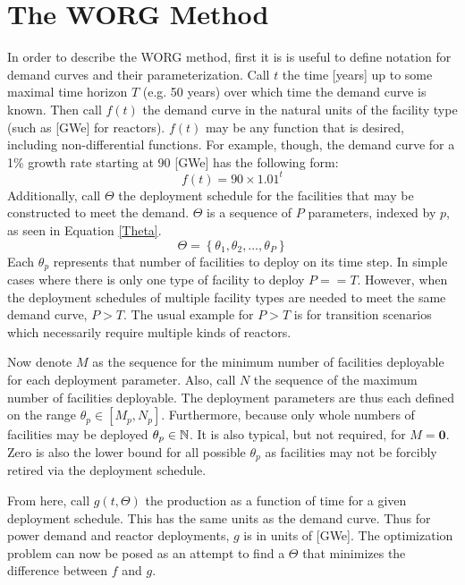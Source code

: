 \section{The WORG Method}
\label{method}

In order to describe the WORG method, first it is is useful to define  
notation for demand curves and their parameterization.  Call $t$ the time
[years] up to some maximal time horizon $T$ (e.g. 50 years) over which time 
the demand curve is known.  Then call $f(t)$ the demand curve in the natural 
units of the facility type (such as [GWe] for reactors).
$f(t)$ may be any function that is desired, including non-differential 
functions. For example, though, the demand curve for a 1\% growth rate 
starting at 90 [GWe] has the following form:
\begin{equation}
\label{f-1}
f(t) = 90\times 1.01^t
\end{equation}
Additionally, call $\Theta$ the deployment schedule for the facilities that 
may be constructed to meet the demand.
$\Theta$ is a sequence of $P$ parameters, indexed by $p$, as seen in 
Equation \ref{Theta}.
\begin{equation}
\label{Theta}
\Theta = \left\{\theta_1, \theta_2, \ldots, \theta_P\right\}
\end{equation}
Each $\theta_p$ represents that number of facilities to deploy on its
time step. In simple cases where there is only one type of facility
to deploy $P == T$.  However, when the deployment schedules of multiple 
facility types are needed to meet the same demand curve, $P > T$.  The usual
example for $P > T$ is for transition scenarios which necessarily require 
multiple kinds of reactors.

Now denote $M$ as the sequence for the minimum number of facilities deployable
for each deployment parameter. Also, call $N$ the sequence of the maximum number
of facilities deployable. The deployment parameters are thus each defined
on the range $\theta_p \in [M_p, N_p]$. Furthermore, because only whole
numbers of facilities may be deployed $\theta_p \in \mathbb{N}$.  It is also typical, 
but not required, for $M = \mathbf{0}$. Zero is also the lower bound
for all possible $\theta_p$ as facilities may not be forcibly retired via the
deployment schedule.

From here, call $g(t, \Theta)$ the production as a function of time for a
given deployment schedule. This has the same units as the demand curve.
Thus for power demand and reactor deployments, $g$ is in units of [GWe]. The 
optimization problem can now be posed as an attempt to find a $\Theta$
that minimizes the difference between $f$ and $g$.




